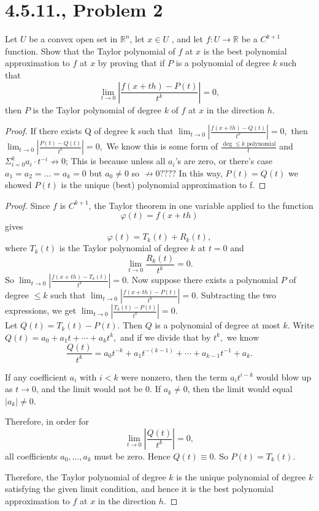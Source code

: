 \documentclass{article}
\begin{document}
\section*{4.5.11., Problem 2}
Let $U$ be a convex open set in $\mathbb{R}^n$, let $x \in U$ , and let $f : U \rightarrow \mathbb{R}$ be a $C^{k+1}$ function. Show that the Taylor polynomial of $f$ at $x$ is the best polynomial approximation to $f$ at $x$ by proving that if $P$ is
a polynomial of degree $k$ such that
$$\lim_{t \rightarrow 0} |\frac{f(x+th)-P(t)}{t^k}| = 0,$$
then $P$ is the Taylor polynomial of degree $k$ of $f$ at $x$ in the direction $h$.
\begin{proof}
    If there exists Q of degree k such that
    $\lim_{t \rightarrow 0} |\frac{f(x+th)-Q(t)}{t^k}| = 0,$ then $\lim_{t \rightarrow 0} |\frac{P(t)-Q(t)}{t^k}| = 0,$ We know this is some form of $\frac{\deg \leq k \text{ polynomial}}{t}$ and $\Sigma_{i=0}^ka_i \cdot t^{-i} \not\to 0$; This is because unless all $a_i$'s are zero, or there's case $a_1=a_2=...=a_k=0$ but $a_0 \neq 0$ so $\not \to 0????$ In this way, $P(t)=Q(t)$ we showed $P(t)$ is the unique (best) polynomial approximation to f.  
\end{proof}

\begin{proof}
    Since $f$ is $C^{k+1}$, the Taylor theorem in one variable applied to the function
    $$\varphi(t)=f(x+th)$$
    gives
    $$\varphi(t)=T_k(t)+R_k(t),$$
    where $T_k(t)$ is the Taylor polynomial of degree $k$ at $t=0$ and
    $$\lim_{t\to 0}\frac{R_k(t)}{t^k}=0.$$
    So $\lim_{t\to 0}\left|\frac{f(x+th)-T_k(t)}{t^k}\right|=0.$ Now suppose there exists a polynomial $P$ of degree $\le k$ such that
    $\lim_{t \rightarrow 0} |\frac{f(x+th)-P(t)}{t^k}| = 0.$     Subtracting the two expressions, we get
    $\lim_{t\to 0}|\frac{T_k(t)-P(t)}{t^k}|=0.$ \\
    Let $Q(t)=T_k(t)-P(t).$
    Then $Q$ is a polynomial of degree at most $k$. Write
    $Q(t)=a_0+a_1t+\cdots+a_kt^k,$ and if we divide that by $t^k,$ we know 
    $$\frac{Q(t)}{t^k}=a_0 t^{-k}+a_1 t^{-(k-1)}+\cdots+a_{k-1}t^{-1}+a_k.$$

    If any coefficient $a_i$ with $i<k$ were nonzero, then the term $a_i t^{i-k}$ would blow up as $t\to 0$, and the limit would not be $0$.  
    If $a_k \neq 0$, then the limit would equal $|a_k| \neq 0$.

    Therefore, in order for
    $$\lim_{t\to 0}\left|\frac{Q(t)}{t^k}\right|=0,$$
    all coefficients $a_0,\dots,a_k$ must be zero. Hence $Q(t)\equiv 0$. So $P(t)=T_k(t).$

    Therefore, the Taylor polynomial of degree $k$ is the unique polynomial of degree $k$ satisfying the given limit condition, and hence it is the best polynomial approximation to $f$ at $x$ in the direction $h$.
\end{proof}
\clearpage
\end{document}
